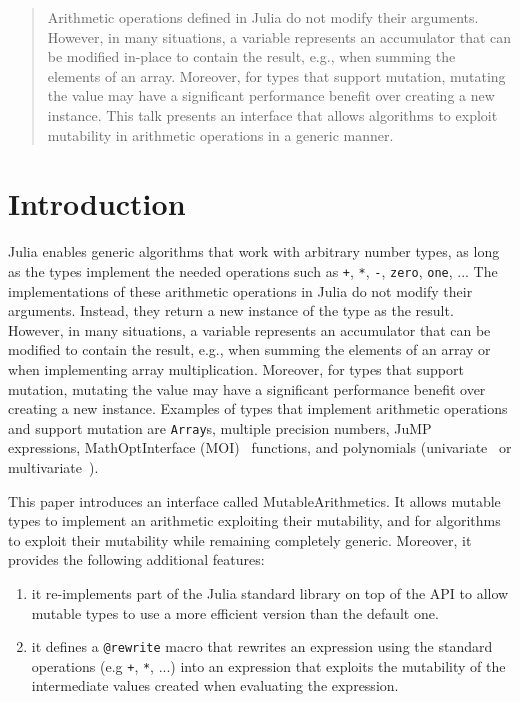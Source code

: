 \documentclass{juliacon}
\newcommand{\ma}{MutableArithmetics}
\begin{document}


\maketitle

\begin{abstract}

Arithmetic operations defined in Julia do not modify their arguments.
However, in many situations, a variable represents an accumulator that can be modified in-place to contain the result, e.g., when summing the elements of an array.
Moreover, for types that support mutation, mutating the value may have a significant performance benefit over creating a new instance.
This talk presents an interface that allows algorithms to exploit mutability in arithmetic operations in a generic manner.

\end{abstract}

\section{Introduction}

Julia enables generic algorithms that work with arbitrary number types, as long as the types implement the needed operations
such as \texttt{+}, \texttt{*}, \texttt{-}, \texttt{zero}, \texttt{one}, ...
The implementations of these arithmetic operations in Julia do not modify their arguments. Instead, they return a new instance of the type as the result.
However, in many situations, a variable represents an accumulator that can be modified to contain the result, e.g.,
when summing the elements of an array or when implementing array multiplication.
Moreover, for types that support mutation, mutating the value may have a significant performance benefit over creating a new instance.
Examples of types that implement arithmetic operations and support mutation are \texttt{Array}s, multiple precision numbers, JuMP~\cite{dunning2017jump} expressions, MathOptInterface (MOI)~\cite{legat2021mathoptinterface} functions, and polynomials (univariate~\cite{verzani2021polynomials} or multivariate~\cite{legat2021multivariatepolynomials}).

This paper introduces an interface called \ma{}.
It allows mutable types to implement an arithmetic exploiting their mutability, and for algorithms to
exploit their mutability while remaining completely generic.
Moreover, it provides the following additional features:
\begin{enumerate}
  \item
    \label{item:reimplement}
    it re-implements part of the Julia standard library on top of the API to allow mutable types to use a more efficient version than the default one.
  \item
    \label{item:rewrite}
    it defines a \texttt{@rewrite} macro that rewrites an expression using the standard operations (e.g \texttt{+}, \texttt{*}, ...) into an expression that exploits the mutability of the intermediate values created when evaluating the expression.
\end{enumerate}
\end{document}
